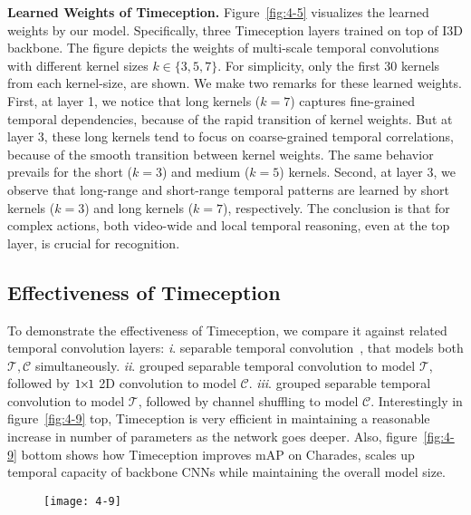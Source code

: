 \documentclass[10pt,twocolumn,letterpaper]{article}
\newcommand{\partitle}[1]{\noindent\textbf{#1}}
\newcommand{\ptspace}{\vspace*{5pt}}
\begin{document}
\ptspace
\partitle{Learned Weights of Timeception.}
Figure~\ref{fig:4-5} visualizes the learned weights by our model.
Specifically, three Timeception layers trained on top of I3D backbone.
The figure depicts the weights of multi-scale temporal convolutions with different kernel sizes $k \in \{3, 5, 7\}$.
For simplicity, only the first 30 kernels from each kernel-size, are shown.
We make two remarks for these learned weights.
First, at layer 1, we notice that long kernels ($k=7$) captures fine-grained temporal dependencies, because of the rapid transition of kernel weights.
But at layer 3, these long kernels tend to focus on coarse-grained temporal correlations, because of the smooth transition between kernel weights.
The same behavior prevails for the short ($k=3$) and medium ($k=5$) kernels.
Second, at layer 3, we observe that long-range and short-range temporal patterns are learned by short kernels ($k=3$) and long kernels ($k=7$), respectively.
The conclusion is that for complex actions, both video-wide and local temporal reasoning, even at the top layer, is crucial for recognition.

\subsection{Effectiveness of Timeception}
To demonstrate the effectiveness of Timeception, we compare it against related temporal convolution layers:
\textit{i}. separable temporal convolution~\cite{tran2018closer}, that models both $\mathcal{T}, \mathcal{C}$ simultaneously.
\textit{ii}. grouped separable temporal convolution to model $\mathcal{T}$, followed by $1 {\mkern-2mu\times\mkern-2mu} 1$ 2D convolution to model $\mathcal{C}$.
\textit{iii}. grouped separable temporal convolution to model $\mathcal{T}$, followed by channel shuffling to model $\mathcal{C}$.
Interestingly in figure~\ref{fig:4-9} top, Timeception is very efficient in maintaining a reasonable increase in number of parameters as the network goes deeper.
Also, figure~\ref{fig:4-9} bottom shows how Timeception improves mAP on Charades, scales up temporal capacity of backbone CNNs while maintaining the overall model size.

\begin{figure}[ht]
\begin{center}
\texttt{[image: 4-9]}
\end{center}
\vspace*{-10mm}
\end{figure}
\end{document}

